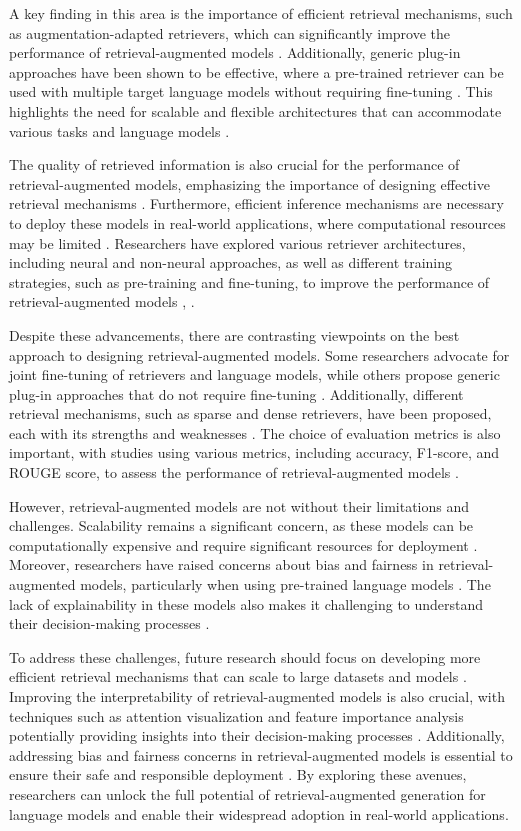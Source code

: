 \documentclass[conference]{IEEEtran}
\begin{document}
A key finding in this area is the importance of efficient retrieval mechanisms, such as augmentation-adapted retrievers, which can significantly improve the performance of retrieval-augmented models \cite{b5}. Additionally, generic plug-in approaches have been shown to be effective, where a pre-trained retriever can be used with multiple target language models without requiring fine-tuning \cite{b6}. This highlights the need for scalable and flexible architectures that can accommodate various tasks and language models \cite{b7}.

The quality of retrieved information is also crucial for the performance of retrieval-augmented models, emphasizing the importance of designing effective retrieval mechanisms \cite{b8}. Furthermore, efficient inference mechanisms are necessary to deploy these models in real-world applications, where computational resources may be limited \cite{b9}. Researchers have explored various retriever architectures, including neural and non-neural approaches, as well as different training strategies, such as pre-training and fine-tuning, to improve the performance of retrieval-augmented models \cite{b10}, \cite{b11}.

Despite these advancements, there are contrasting viewpoints on the best approach to designing retrieval-augmented models. Some researchers advocate for joint fine-tuning of retrievers and language models, while others propose generic plug-in approaches that do not require fine-tuning \cite{b12}. Additionally, different retrieval mechanisms, such as sparse and dense retrievers, have been proposed, each with its strengths and weaknesses \cite{b13}. The choice of evaluation metrics is also important, with studies using various metrics, including accuracy, F1-score, and ROUGE score, to assess the performance of retrieval-augmented models \cite{b14}.

However, retrieval-augmented models are not without their limitations and challenges. Scalability remains a significant concern, as these models can be computationally expensive and require significant resources for deployment \cite{b15}. Moreover, researchers have raised concerns about bias and fairness in retrieval-augmented models, particularly when using pre-trained language models \cite{b16}. The lack of explainability in these models also makes it challenging to understand their decision-making processes \cite{b17}.

To address these challenges, future research should focus on developing more efficient retrieval mechanisms that can scale to large datasets and models \cite{b18}. Improving the interpretability of retrieval-augmented models is also crucial, with techniques such as attention visualization and feature importance analysis potentially providing insights into their decision-making processes \cite{b19}. Additionally, addressing bias and fairness concerns in retrieval-augmented models is essential to ensure their safe and responsible deployment \cite{b20}. By exploring these avenues, researchers can unlock the full potential of retrieval-augmented generation for language models and enable their widespread adoption in real-world applications.
\end{document}
